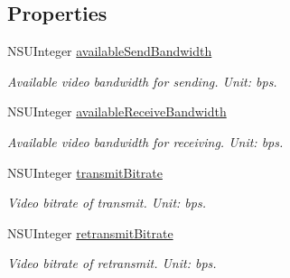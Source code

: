 \subsection*{Properties}
\begin{DoxyCompactItemize}
\item 
\mbox{\label{interface_c_c_video_band_width_status_a78e9515d1ce6cf922b8d93837d05c051}} 
N\+S\+U\+Integer \hyperlink{interface_c_c_video_band_width_status_a78e9515d1ce6cf922b8d93837d05c051}{available\+Send\+Bandwidth}
\begin{DoxyCompactList}\small\item\em Available video bandwidth for sending. Unit\+: bps. \end{DoxyCompactList}\item 
\mbox{\label{interface_c_c_video_band_width_status_ae945b492cd49c093b0cfe631e0caa306}} 
N\+S\+U\+Integer \hyperlink{interface_c_c_video_band_width_status_ae945b492cd49c093b0cfe631e0caa306}{available\+Receive\+Bandwidth}
\begin{DoxyCompactList}\small\item\em Available video bandwidth for receiving. Unit\+: bps. \end{DoxyCompactList}\item 
\mbox{\label{interface_c_c_video_band_width_status_adb52f4064e62dccfd0dd82f32da829ba}} 
N\+S\+U\+Integer \hyperlink{interface_c_c_video_band_width_status_adb52f4064e62dccfd0dd82f32da829ba}{transmit\+Bitrate}
\begin{DoxyCompactList}\small\item\em Video bitrate of transmit. Unit\+: bps. \end{DoxyCompactList}\item 
\mbox{\label{interface_c_c_video_band_width_status_aaafb85bc0cce06414090215b09f98dad}} 
N\+S\+U\+Integer \hyperlink{interface_c_c_video_band_width_status_aaafb85bc0cce06414090215b09f98dad}{retransmit\+Bitrate}
\begin{DoxyCompactList}\small\item\em Video bitrate of retransmit. Unit\+: bps. \end{DoxyCompactList}\item 
\mbox{\label{interface_c_c_video_band_width_status_aa4091d323f84d68132c7b91dca2c6d11}} 

\end{DoxyCompactItemize}
